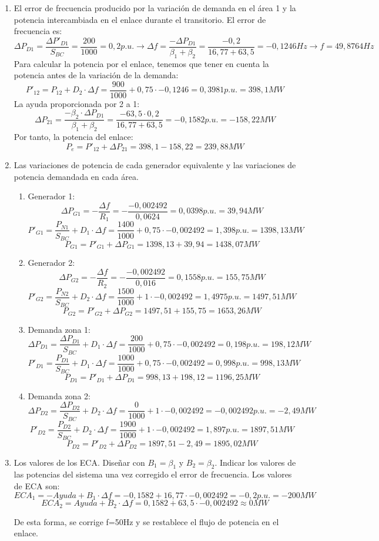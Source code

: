 \begin{enumerate}
\begin{enumerate}
	\end{enumerate}
	\item El error de frecuencia producido por la variación de demanda en el área 1 y la potencia intercambiada en el enlace durante el transitorio.
	El error de frecuencia es:
	\[\Delta P_{D1}= \frac{\Delta P'_{D1}}{S_{BC}}=\frac{200}{1000}=0,2p.u.\rightarrow \Delta f= \frac{-\Delta P_{D1}}{\beta_1+\beta_2}=\frac{-0,2}{16,77+63,5}=-0,1246Hz\rightarrow f=49,8764Hz\]
	Para calcular la potencia por el enlace, tenemos que tener en cuenta la potencia antes de la variación de la demanda:
	\[P'_{12}=P_{12}+D_2\cdot\Delta f=\frac{900}{1000}+0,75\cdot-0,1246=0,3981p.u.=398,1MW\]
	La ayuda proporcionada por 2 a 1:
	\[\Delta P_{21}=\frac{-\beta_2\cdot\Delta P_{D1}}{\beta_1+\beta_2}=\frac{-63,5\cdot0,2}{16,77+63,5}=-0,1582p.u.=-158,22MW\]
	Por tanto, la potencia del enlace:
	\[P_e=P'_{12}+\Delta P_{21}=398,1-158,22=239,88MW\]
	\item Las variaciones de potencia de cada generador equivalente y las variaciones de potencia demandada en cada área.
	\begin{enumerate}
		\item Generador 1:
		\[\Delta P_{G1}=-\frac{\Delta f}{R_1}=-\frac{-0,002492}{0,0624}=0,0398p.u.=39,94MW\]
		\[P'_{G1}=\frac{P_{N1}}{S_{BC}}+D_1\cdot\Delta f=\frac{1400}{1000}+0,75\cdot-0,002492=1,398p.u.=1398,13MW\]
		\[P_{G1}=P'_{G1}+\Delta P_{G1}=1398,13+39,94=1438,07MW\]
		\item Generador 2:
		\[\Delta P_{G2}=-\frac{\Delta f}{R_2}=-\frac{-0,002492}{0,016}=0,1558p.u.=155,75MW\]
		\[P'_{G2}=\frac{P_{N2}}{S_{BC}}+D_2\cdot\Delta f=\frac{1500}{1000}+1\cdot-0,002492=1,4975p.u.=1497,51MW\]
		\[P_{G2}=P'_{G2}+\Delta P_{G2}=1497,51+155,75=1653,26MW\]
		\item Demanda zona 1:
		\[\Delta P_{D1}=\frac{\Delta P_{D1}}{S_{BC}}+D_1\cdot\Delta f=\frac{200}{1000}+0,75\cdot-0,002492=0,198p.u.=198,12MW\]
		\[P'_{D1}=\frac{P_{D1}}{S_{BC}}+D_1\cdot\Delta f=\frac{1000}{1000}+0,75\cdot-0,002492=0,998p.u.=998,13MW\]
		\[P_{D1}=P'_{D1}+\Delta P_{D1}=998,13+198,12=1196,25MW\]
		\item Demanda zona 2:
		\[\Delta P_{D2}=\frac{\Delta P_{D2}}{S_{BC}}+D_2\cdot\Delta f=\frac{0}{1000}+1\cdot-0,002492=-0,002492p.u.=-2,49MW\]
		\[P'_{D2}=\frac{P_{D2}}{S_{BC}}+D_2\cdot\Delta f=\frac{1900}{1000}+1\cdot-0,002492=1,897p.u.=1897,51MW\]
		\[P_{D2}=P'_{D2}+\Delta P_{D2}=1897,51-2,49=1895,02MW\]
	\end{enumerate}
	\item Los valores de los ECA. Diseñar con $B_1=\beta_1$ y $B_2=\beta_2$. Indicar los valores de las potencias del sistema una vez corregido el error de frecuencia.
	Los valores de ECA son:
	\[ECA_1=-Ayuda+B_1\cdot \Delta f=-0,1582+16,77\cdot-0,002492=-0,2p.u.=-200MW\]
	\[ECA_2=Ayuda+B_2\cdot \Delta f=0,1582+63,5\cdot-0,002492\approx0MW\]
	
	
	De esta forma, se corrige f=50Hz y se restablece el flujo de potencia en el enlace.
\end{enumerate}
\newpage

